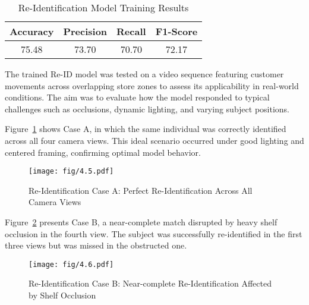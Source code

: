 {\begin{table}[htbp]
	\begin{doublespace}
		\centering
		\caption[Re-Identification Model Training Results]{\newline \newline Re-Identification Model Training Results}
		\begin{tabular}{|c|c|c|c|}
			\hline
			\textbf{Accuracy} & \textbf{Precision} & \textbf{Recall} & \textbf{F1-Score} \\
			\hline
			75.48 & 73.70 & 70.70 & 72.17 \\
			\hline
		\end{tabular}
	\end{doublespace}
\end{table}

The trained Re-ID model was tested on a video sequence featuring customer movements across overlapping store zones to assess its applicability in real-world conditions. The aim was to evaluate how the model responded to typical challenges such as occlusions, dynamic lighting, and varying subject positions.

Figure~\ref{fig:4.5} shows Case A, in which the same individual was correctly identified across all four camera views. This ideal scenario occurred under good lighting and centered framing, confirming optimal model behavior.

\begin{figure}[H]
	\caption[Re-Identification Case A: Perfect Re-Identification Across All Camera Views]{\newline \newline Re-Identification Case A: Perfect Re-Identification Across All Camera Views}
	\centering
	\texttt{[image: fig/4.5.pdf]}
	\label{fig:4.5}
\end{figure}

Figure~\ref{fig:4.6} presents Case B, a near-complete match disrupted by heavy shelf occlusion in the fourth view. The subject was successfully re-identified in the first three views but was missed in the obstructed one.

\begin{figure}[H]
	\caption[Re-Identification Case B: Near-complete Re-Identification Affected by Shelf Occlusion]{\newline \newline Re-Identification Case B: Near-complete Re-Identification Affected by Shelf Occlusion}
	\centering
	\texttt{[image: fig/4.6.pdf]}
	\label{fig:4.6}
\end{figure}

}

